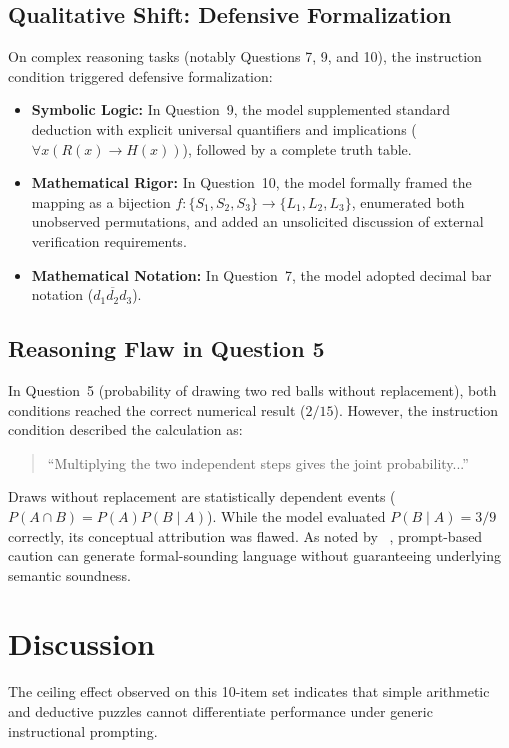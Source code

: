 \documentclass[11pt,a4paper]{article}
\begin{document}
\subsection{Qualitative Shift: Defensive Formalization}

On complex reasoning tasks (notably Questions 7, 9, and 10), the instruction condition triggered defensive formalization:
\begin{itemize}[leftmargin=*]
    \item \textbf{Symbolic Logic:} In Question~9, the model supplemented standard deduction with explicit universal quantifiers and implications ($\forall x (R(x) \to H(x))$), followed by a complete truth table.
    \item \textbf{Mathematical Rigor:} In Question~10, the model formally framed the mapping as a bijection $f: \{S_1, S_2, S_3\} \to \{L_1, L_2, L_3\}$, enumerated both unobserved permutations, and added an unsolicited discussion of external verification requirements.
    \item \textbf{Mathematical Notation:} In Question~7, the model adopted decimal bar notation ($\overline{d_1d_2d_3}$).
\end{itemize}

\subsection{Reasoning Flaw in Question 5}

In Question~5 (probability of drawing two red balls without replacement), both conditions reached the correct numerical result ($2/15$). However, the instruction condition described the calculation as:
\begin{quote}
``Multiplying the two independent steps gives the joint probability...''
\end{quote}
Draws without replacement are statistically dependent events ($P(A \cap B) = P(A)P(B \mid A)$). While the model evaluated $P(B \mid A) = 3/9$ correctly, its conceptual attribution was flawed. As noted by \citeauthor{kamoi2024}~\cite{kamoi2024}, prompt-based caution can generate formal-sounding language without guaranteeing underlying semantic soundness.

\section{Discussion}

The ceiling effect observed on this 10-item set indicates that simple arithmetic and deductive puzzles cannot differentiate performance under generic instructional prompting.
\end{document}
